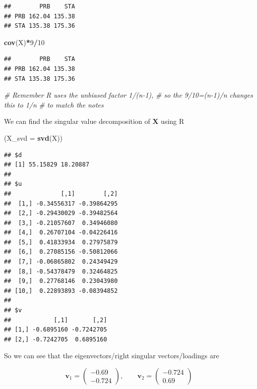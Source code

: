 \documentclass[
]{book}
\newenvironment{Shaded}{\begin{snugshade}}{\end{snugshade}}
\newcommand{\AttributeTok}[1]{\textcolor[rgb]{0.13,0.29,0.53}{#1}}
\newcommand{\CommentTok}[1]{\textcolor[rgb]{0.56,0.35,0.01}{\textit{#1}}}
\newcommand{\DecValTok}[1]{\textcolor[rgb]{0.00,0.00,0.81}{#1}}
\newcommand{\FunctionTok}[1]{\textcolor[rgb]{0.13,0.29,0.53}{\textbf{#1}}}
\newcommand{\NormalTok}[1]{#1}
\newcommand{\SpecialCharTok}[1]{\textcolor[rgb]{0.81,0.36,0.00}{\textbf{#1}}}
\theoremstyle{definition}
\theoremstyle{definition}
\theoremstyle{definition}
\theoremstyle{definition}
\theoremstyle{remark}
\begin{document}
\begin{verbatim}
##        PRB    STA
## PRB 162.04 135.38
## STA 135.38 175.36
\end{verbatim}

\begin{Shaded}
\begin{Highlighting}[]
\FunctionTok{cov}\NormalTok{(X)}\SpecialCharTok{*}\DecValTok{9}\SpecialCharTok{/}\DecValTok{10} 
\end{Highlighting}
\end{Shaded}

\begin{verbatim}
##        PRB    STA
## PRB 162.04 135.38
## STA 135.38 175.36
\end{verbatim}

\begin{Shaded}
\begin{Highlighting}[]
\CommentTok{\# Remember R uses the unbiased factor 1/(n{-}1), }
\CommentTok{\# so the 9/10=(n{-}1)/n changes this to 1/n }
\CommentTok{\# to match the notes}
\end{Highlighting}
\end{Shaded}

We can find the singular value decomposition of \(\mathbf X\) using R

\begin{Shaded}
\begin{Highlighting}[]
\NormalTok{(}\AttributeTok{X\_svd =} \FunctionTok{svd}\NormalTok{(X))}
\end{Highlighting}
\end{Shaded}

\begin{verbatim}
## $d
## [1] 55.15829 18.20887
## 
## $u
##              [,1]        [,2]
##  [1,] -0.34556317 -0.39864295
##  [2,] -0.29430029 -0.39482564
##  [3,] -0.21057607  0.34946080
##  [4,]  0.26707104 -0.04226416
##  [5,]  0.41833934  0.27975879
##  [6,]  0.27085156 -0.50812066
##  [7,] -0.06865802  0.24349429
##  [8,] -0.54378479  0.32464825
##  [9,]  0.27768146  0.23043980
## [10,]  0.22893893 -0.08394852
## 
## $v
##            [,1]       [,2]
## [1,] -0.6895160 -0.7242705
## [2,] -0.7242705  0.6895160
\end{verbatim}

So we can see that the eigenvectors/right singular vectors/loadings are

\[\mathbf v_1=\begin{pmatrix} -0.69 \\ -0.724 \end{pmatrix},\qquad \mathbf v_2=\begin{pmatrix} -0.724 \\ 0.69 \end{pmatrix}\]
\end{document}
